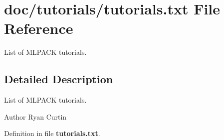 \section{doc/tutorials/tutorials.txt File Reference}
\label{tutorials_8txt}


List of M\-L\-P\-A\-C\-K tutorials.  




\subsection{Detailed Description}
List of M\-L\-P\-A\-C\-K tutorials. \begin{DoxyAuthor}{Author}
Ryan Curtin 
\end{DoxyAuthor}


Definition in file {\bf tutorials.\-txt}.

